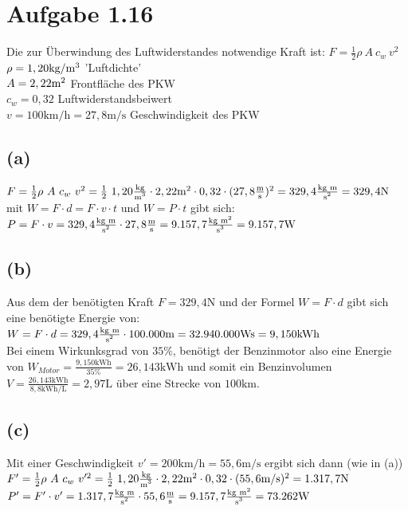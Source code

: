 \documentclass[]{article}
\newcommand{\unit}[1]{\text{#1}}
\newcommand{\fracunit}[2]{\frac{\unit{#1}}{\unit{#2}}}
\newcommand{\textsq}[1]{\ensuremath{\text{#1}^2}}
\newcommand{\textpow}[2]{\ensuremath{\text{#1}^{#2}}}
\begin{document}
\section*{Aufgabe 1.16}
\par
	Die zur Überwindung des Luftwiderstandes notwendige Kraft ist: $F = \frac{1}{2}\rho~A~c_w~v^2$\\
	$\rho = 1,20\unit{kg/\textpow{m}{3}}$ 'Luftdichte'\\
	$A = 2,22\unit{\textsq{m}} $ Frontfläche des PKW\\
	$c_w = 0,32$ Luftwiderstandsbeiwert\\
	$v = 100\unit{km/h} = 27,8\unit{m/s}$ Geschwindigkeit des PKW

\subsection*{(a)}
	$F = \frac{1}{2}\rho~A~c_w~v^2 = \frac{1}{2}~1,20\fracunit{kg}{\textpow{m}{3}}\cdot 2,22\unit{\textsq{m}} \cdot 0,32 \cdot (27,8\fracunit{m}{s})^2 = 329,4\fracunit{kg~m}{\textsq{s}} = 329,4\unit{N}$\\
	mit $W = F \cdot d = F \cdot v \cdot t$ und $W = P \cdot t$ gibt sich:\\
	$P = F \cdot v = 329,4\fracunit{kg~m}{\textsq{s}} \cdot 27,8\fracunit{m}{s} = 9.157,7\fracunit{kg~\textsq{m}}{\textpow{s}{3}} = 9.157,7\unit{W}$
\subsection*{(b)}
	Aus dem der benötigten Kraft $F = 329,4\unit{N}$ und der Formel $W = F \cdot d$ gibt sich eine benötigte Energie von:\\
	$W = F \cdot d = 329,4\fracunit{kg~m}{\textsq{s}} \cdot 100.000\unit{m} = 32.940.000\unit{Ws} = 9,150\unit{kWh}$\\
	Bei einem Wirkunksgrad von $35\%$, benötigt der Benzinmotor also eine Energie von $W_{Motor} = \frac{9,150\unit{kWh}}{35\%} = 26,143\unit{kWh}$ und somit ein Benzinvolumen $V = \frac{26,143\unit{kWh}}{8,8\unit{kWh/L}} = 2,97\unit{L}$ über eine Strecke von $100\unit{km}$.
\subsection*{(c)}
	Mit einer Geschwindigkeit $v' = 200\unit{km/h} = 55,6\unit{m/s}$ ergibt sich dann (wie in (a))\\
	$F' = \frac{1}{2}\rho~A~c_w~v'^2 = \frac{1}{2}~1,20\fracunit{kg}{\textpow{m}{3}}\cdot 2,22\unit{\textsq{m}} \cdot 0,32 \cdot (55,6\unit{m/s})^2 = 1.317,7\unit{N}$\\
	$P' = F' \cdot v' = 1.317,7\fracunit{kg~m}{\textsq{s}} \cdot 55,6\fracunit{m}{s} = 9.157,7\fracunit{kg~\textsq{m}}{\textpow{s}{3}} = 73.262\unit{W}$
\end{document}
